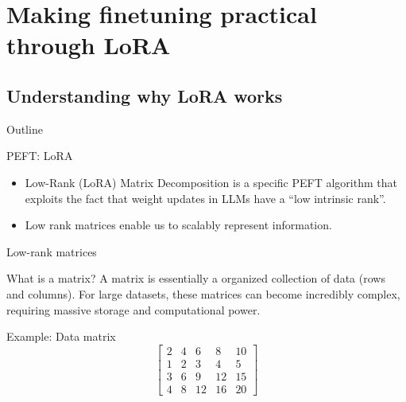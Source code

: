 \documentclass[24pt]{beamer}
\begin{document}
\section{Making finetuning practical through LoRA}

\subsection{Understanding why LoRA works}

\begin{frame}{Outline}
   	\tableofcontents[currentsection]
\end{frame}

\begin{frame}
   	\sectionpage
   	\subsectionpage
\end{frame}

\begin{frame}{PEFT: LoRA}
    \begin{itemize}
        \item Low-Rank (LoRA) Matrix Decomposition is a specific PEFT
        algorithm that exploits the fact that weight updates in LLMs have a
        \alert{``low intrinsic rank''}.

        \item Low rank matrices enable us to \alert{scalably} represent
        information.
    \end{itemize}
\end{frame}

\begin{frame}{Low-rank matrices}
    \begin{block}{What is a matrix?}
        A matrix is essentially a organized collection of data (rows and
        columns). For large datasets, these matrices can become incredibly
        complex, requiring massive storage and computational power.
    \end{block}

    \begin{exampleblock}{Example: Data matrix}
        \[
        \begin{bmatrix}
            2 & 4 & 6 & 8 & 10\\
            1 & 2 & 3 & 4 & 5\\
            3 & 6 & 9 & 12 & 15\\
            4 & 8 & 12 & 16 & 20
        \end{bmatrix}
        \]
    \end{exampleblock}
\end{frame}
\end{document}
